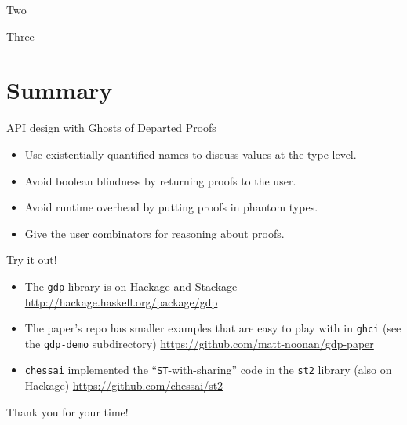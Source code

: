 \documentclass{beamer}
\begin{document}
\begin{frame}{Two}

\end{frame}

\begin{frame}{Three}

\end{frame}

  \section{Summary}   %
\begin{frame}{API design with Ghosts of Departed Proofs}
  \begin{itemize}
  \item{Use \alert{existentially-quantified names} to discuss values at the type level.}
  \bigskip
  \item{Avoid boolean blindness by \alert{returning proofs to the user}.}
  \bigskip
  \item{Avoid runtime overhead by putting \alert{proofs in phantom types}.}
  \bigskip
  \item{Give the user \alert{combinators for reasoning} about proofs.}
  \end{itemize}

\end{frame}


\begin{frame}{Try it out!}
  \begin{itemize}
  \item{The \texttt{gdp} library is on Hackage and Stackage
    \url{http://hackage.haskell.org/package/gdp}\medskip
  }
  \item{The paper's repo has smaller examples that are easy to play with
    in \texttt{ghci} (see the \texttt{gdp-demo} subdirectory)
    \url{https://github.com/matt-noonan/gdp-paper}\medskip}
  \item{\texttt{chessai} implemented the ``\texttt{ST}-with-sharing'' code
    in the \texttt{st2} library (also on Hackage) \url{https://github.com/chessai/st2}}
  \end{itemize}
  \medskip
  \Large{Thank you for your time!}
\end{frame}
\end{document}
